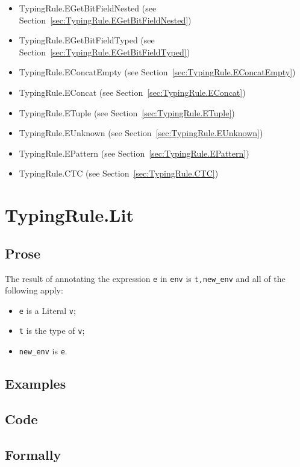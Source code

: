 \documentclass{book}
\begin{document}
\begin{itemize}
\item TypingRule.EGetBitFieldNested (see Section~\ref{sec:TypingRule.EGetBitFieldNested})
\item TypingRule.EGetBitFieldTyped (see Section~\ref{sec:TypingRule.EGetBitFieldTyped})
\item TypingRule.EConcatEmpty (see Section~\ref{sec:TypingRule.EConcatEmpty})
\item TypingRule.EConcat (see Section~\ref{sec:TypingRule.EConcat})
\item TypingRule.ETuple (see Section~\ref{sec:TypingRule.ETuple})
\item TypingRule.EUnknown (see Section~\ref{sec:TypingRule.EUnknown})
\item TypingRule.EPattern (see Section~\ref{sec:TypingRule.EPattern})
\item TypingRule.CTC (see Section~\ref{sec:TypingRule.CTC})
\end{itemize}

\section{TypingRule.Lit \label{sec:TypingRule.Lit}}

  \subsection{Prose}
  The result of annotating the expression \texttt{e} in \texttt{env} is
\texttt{t,new\_env} and all of the following apply:
  \begin{itemize}
  \item \texttt{e} is a Literal \texttt{v};
  \item \texttt{t} is the type of \texttt{v};
  \item \texttt{new\_env} is \texttt{e}.
  \end{itemize}

  \subsection{Examples}

  \subsection{Code}
 
  \subsection{Formally}
\end{document}
